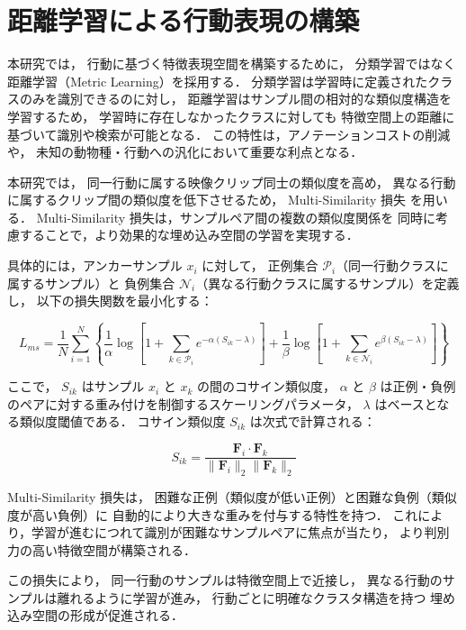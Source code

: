 \section{距離学習による行動表現の構築}

本研究では，
行動に基づく特徴表現空間を構築するために，
分類学習ではなく距離学習（Metric Learning）を採用する．
分類学習は学習時に定義されたクラスのみを識別できるのに対し，
距離学習はサンプル間の相対的な類似度構造を学習するため，
学習時に存在しなかったクラスに対しても
特徴空間上の距離に基づいて識別や検索が可能となる．
この特性は，アノテーションコストの削減や，
未知の動物種・行動への汎化において重要な利点となる．

本研究では，
同一行動に属する映像クリップ同士の類似度を高め，
異なる行動に属するクリップ間の類似度を低下させるため，
Multi-Similarity 損失 \cite{wang2019multi} を用いる．
Multi-Similarity 損失は，サンプルペア間の複数の類似度関係を
同時に考慮することで，より効果的な埋め込み空間の学習を実現する．

具体的には，アンカーサンプル $x_i$ に対して，
正例集合 $\mathcal{P}_i$（同一行動クラスに属するサンプル）と
負例集合 $\mathcal{N}_i$（異なる行動クラスに属するサンプル）を定義し，
以下の損失関数を最小化する：

\begin{equation}
  L_{ms} = \frac{1}{N} \sum_{i=1}^{N} \left\{
    \frac{1}{\alpha} \log \left[ 1 + \sum_{k \in \mathcal{P}_i} e^{-\alpha (S_{ik} - \lambda)} \right]
    + \frac{1}{\beta} \log \left[ 1 + \sum_{k \in \mathcal{N}_i} e^{\beta (S_{ik} - \lambda)} \right]
  \right\}
  \label{eq:ms_loss}
\end{equation}

ここで，
$S_{ik}$ はサンプル $x_i$ と $x_k$ の間のコサイン類似度，
$\alpha$ と $\beta$ は正例・負例のペアに対する重み付けを制御するスケーリングパラメータ，
$\lambda$ はベースとなる類似度閾値である．
コサイン類似度 $S_{ik}$ は次式で計算される：

\begin{equation}
  S_{ik} = \frac{\mathbf{F}_i \cdot \mathbf{F}_k}{\|\mathbf{F}_i\|_2 \|\mathbf{F}_k\|_2}
  \label{eq:cosine_sim}
\end{equation}

Multi-Similarity 損失は，
困難な正例（類似度が低い正例）と困難な負例（類似度が高い負例）に
自動的により大きな重みを付与する特性を持つ．
これにより，学習が進むにつれて識別が困難なサンプルペアに焦点が当たり，
より判別力の高い特徴空間が構築される．

この損失により，
同一行動のサンプルは特徴空間上で近接し，
異なる行動のサンプルは離れるように学習が進み，
行動ごとに明確なクラスタ構造を持つ
埋め込み空間の形成が促進される．

